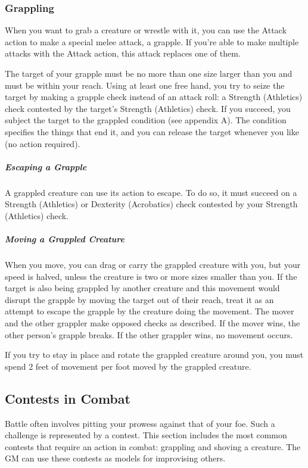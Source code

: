 \subsubsection{Grappling}

When you want to grab a creature or wrestle with it, you can use the Attack action to make a special melee attack, a grapple. If you're able to make multiple attacks with the Attack action, this attack replaces one of them.

The target of your grapple must be no more than one size larger than you and must be within your reach. Using at least one free hand, you try to seize the target by making a grapple check instead of an attack roll: a Strength (Athletics) check contested by the target's Strength (Athletics) check. If you succeed, you subject the target to the grappled condition (see appendix A). The condition specifies the things that end it, and you can release the target whenever you like (no action required).

\subparagraph*{Escaping a Grapple} A grappled creature can use its action to escape. To do so, it must succeed on a Strength (Athletics) or Dexterity (Acrobatics) check contested by your Strength
(Athletics) check.

\subparagraph*{Moving a Grappled Creature} When you move, you can drag or carry the grappled creature with you, but your speed is halved, unless the creature is two or more sizes smaller than you. If the target is also being grappled by another creature and this movement would disrupt the grapple by moving the target out of their reach, treat it as an attempt to escape the grapple by the creature doing the movement. The mover and the other grappler make opposed checks as described. If the mover wins, the other person's grapple breaks. If the other grappler wins, no movement occurs.

If you try to stay in place and rotate the grappled creature around you, you must spend 2 feet of movement per foot moved by the grappled creature.

\subsection{Contests in Combat}

Battle often involves pitting your prowess against that of your foe. Such a challenge is represented by a contest. This section includes the most common contests that require an action in combat: grappling and shoving a creature. The GM can use these contests as models for improvising others.

